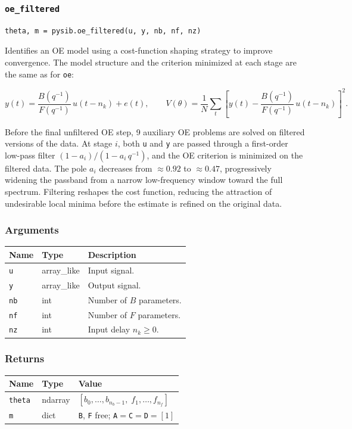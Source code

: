 \documentclass[../main]{subfiles}
\begin{document}
\newpage

\subsubsection{\texttt{oe\_filtered}}

\begin{lstlisting}
theta, m = pysib.oe_filtered(u, y, nb, nf, nz)
\end{lstlisting}

Identifies an OE model using a cost-function shaping strategy to
improve convergence.  The model structure and the criterion minimized
at each stage are the same as for \texttt{oe}:

\[
  y(t) = \frac{B(q^{-1})}{F(q^{-1})}\,u(t - n_k) + e(t), \qquad
  V(\theta) = \frac{1}{N}\sum_t
  \left[y(t) - \frac{B(q^{-1})}{F(q^{-1})}\,u(t-n_k)\right]^2.
\]

Before the final unfiltered OE step, 9 auxiliary OE problems are
solved on filtered versions of the data.  At stage $i$, both
\texttt{u} and \texttt{y} are passed through a first-order low-pass
filter $(1-a_i)/(1-a_i\,q^{-1})$, and the OE criterion is minimized
on the filtered data.  The pole $a_i$ decreases from ${\approx}0.92$
to ${\approx}0.47$, progressively widening the passband from a narrow
low-frequency window toward the full spectrum.  Filtering reshapes the
cost function, reducing the attraction of undesirable local minima
before the estimate is refined on the original data.

\subsubsection*{Arguments}
\begin{center}
\begin{tabular}{lll}
  \toprule
  Name & Type & Description \\
  \midrule
  \texttt{u}  & array\_like & Input signal. \\
  \texttt{y}  & array\_like & Output signal. \\
  \texttt{nb} & int & Number of $B$ parameters. \\
  \texttt{nf} & int & Number of $F$ parameters. \\
  \texttt{nz} & int & Input delay $n_k \geq 0$. \\
  \bottomrule
\end{tabular}
\end{center}

\subsubsection*{Returns}
\begin{center}
\begin{tabular}{lll}
  \toprule
  Name & Type & Value \\
  \midrule
  \texttt{theta} & ndarray & $[b_0,\ldots,b_{n_b-1},\; f_1,\ldots,f_{n_f}]$ \\
  \texttt{m}     & dict    & \texttt{B}, \texttt{F} free; \texttt{A}$=$\texttt{C}$=$\texttt{D}$=[1]$ \\
  \bottomrule
\end{tabular}
\end{center}
\end{document}
